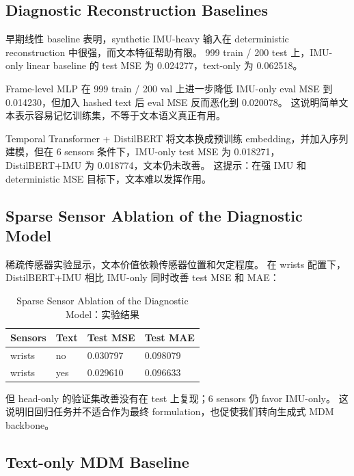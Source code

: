 \subsection{Diagnostic Reconstruction Baselines}

早期线性 baseline 表明，synthetic IMU-heavy 输入在 deterministic reconstruction 中很强，而文本特征帮助有限。
999 train / 200 test 上，IMU-only linear baseline 的 test MSE 为 0.024277，text-only 为 0.062518。

Frame-level MLP 在 999 train / 200 val 上进一步降低 IMU-only eval MSE 到 0.014230，但加入 hashed text 后 eval MSE 反而恶化到 0.020078。
这说明简单文本表示容易记忆训练集，不等于文本语义真正有用。

Temporal Transformer + DistilBERT 将文本换成预训练 embedding，并加入序列建模，但在 6 sensors 条件下，IMU-only test MSE 为 0.018271，DistilBERT+IMU 为 0.018774，文本仍未改善。
这提示：在强 IMU 和 deterministic MSE 目标下，文本难以发挥作用。

\subsection{Sparse Sensor Ablation of the Diagnostic Model}

稀疏传感器实验显示，文本价值依赖传感器位置和欠定程度。
在 wrists 配置下，DistilBERT+IMU 相比 IMU-only 同时改善 test MSE 和 MAE：

\begin{table}[t]
\centering
\caption{Sparse Sensor Ablation of the Diagnostic Model：实验结果}
\label{tab:result-7}
\footnotesize
\setlength{\tabcolsep}{3pt}
\renewcommand{\arraystretch}{1.15}
\begin{tabularx}{\linewidth}{LLLL}
\toprule
Sensors & Text & Test MSE & Test MAE \\
\midrule
wrists & no & 0.030797 & 0.098079 \\
wrists & yes & 0.029610 & 0.096633 \\
\bottomrule
\end{tabularx}
\end{table}


但 head-only 的验证集改善没有在 test 上复现；6 sensors 仍 favor IMU-only。
这说明旧回归任务并不适合作为最终 formulation，也促使我们转向生成式 MDM backbone。

\subsection{Text-only MDM Baseline}

